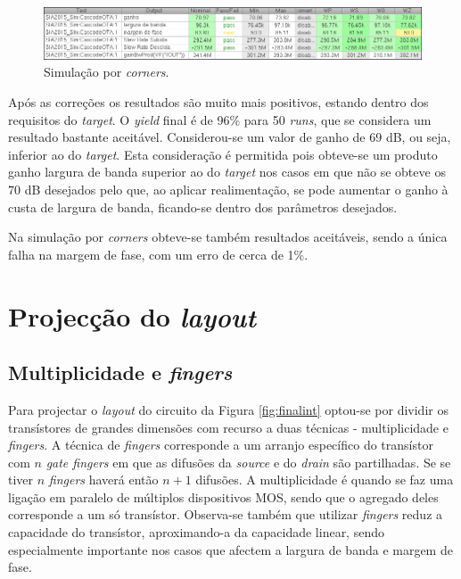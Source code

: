 \documentclass[11pt]{article}
\numberwithin{equation}{section}
\begin{document}
\begin{figure}[H]
	\centering
	\includegraphics[keepaspectratio=true, scale=0.65]{exps/Corners_Novo_semDiv}
	\vspace{-0.5em}
	\caption{Simulação por \textit{corners}.}
	\vspace{-0.8em}
\end{figure} 

Após as correções os resultados são muito mais positivos, estando dentro dos requisitos do \textit{target}. O \textit{yield} final é de 96\% para 50 \textit{runs}, que se considera um resultado bastante aceitável. Considerou-se um valor de ganho de 69 dB, ou seja, inferior ao do \textit{target}. Esta consideração é permitida pois obteve-se um produto ganho largura de banda superior ao do \textit{target} nos casos em que não se obteve os 70 dB desejados pelo que, ao aplicar realimentação, se pode aumentar o ganho à custa de largura de banda, ficando-se dentro dos parâmetros desejados.

Na simulação por \textit{corners} obteve-se também resultados aceitáveis, sendo a única falha na margem de fase, com um erro de cerca de 1\%. 

\section{Projecção do \textit{layout}}

\subsection{Multiplicidade e \textit{fingers}}

Para projectar o \textit{layout} do circuito da Figura \ref{fig:finalint} optou-se por dividir os transístores de grandes dimensões com recurso a duas técnicas - multiplicidade e \textit{fingers}. A técnica de \textit{fingers} corresponde a um arranjo específico do transístor com $n$ \textit{gate fingers} em que as difusões da \textit{source} e do \textit{drain} são partilhadas. Se se tiver $n$ \textit{fingers} haverá então $n+1$ difusões. A multiplicidade é quando se faz uma ligação em paralelo de múltiplos dispositivos MOS, sendo que o agregado deles corresponde a um só transístor. Observa-se também que utilizar \textit{fingers} reduz a capacidade do transístor, aproximando-a da capacidade linear, sendo especialmente importante nos casos que afectem a largura de banda e margem de fase. 
\end{document}
